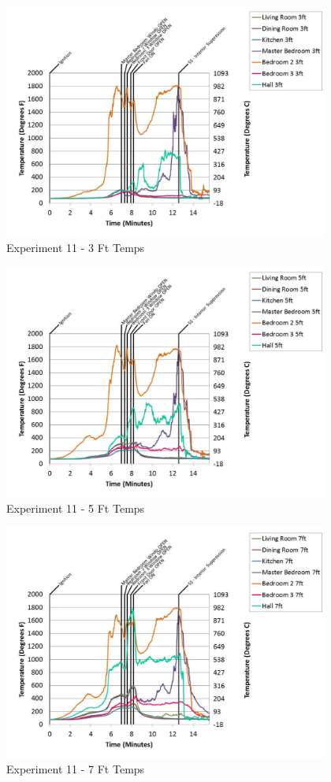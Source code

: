 \documentclass{article}
\begin{document}
\begin{appendices}
	\begin{figure}[h!]
		\centering
		\includegraphics[height=3.05in]{0_Images/Results_Charts/Exp_11_Charts/3FtTemps.pdf}
		\caption{Experiment 11 - 3 Ft Temps}
	\end{figure}
 
	\clearpage

	\begin{figure}[h!]
		\centering
		\includegraphics[height=3.05in]{0_Images/Results_Charts/Exp_11_Charts/5FtTemps.pdf}
		\caption{Experiment 11 - 5 Ft Temps}
	\end{figure}
 

	\begin{figure}[h!]
		\centering
		\includegraphics[height=3.05in]{0_Images/Results_Charts/Exp_11_Charts/7FtTemps.pdf}
		\caption{Experiment 11 - 7 Ft Temps}
	\end{figure}
 

\end{appendices}
\end{document}

